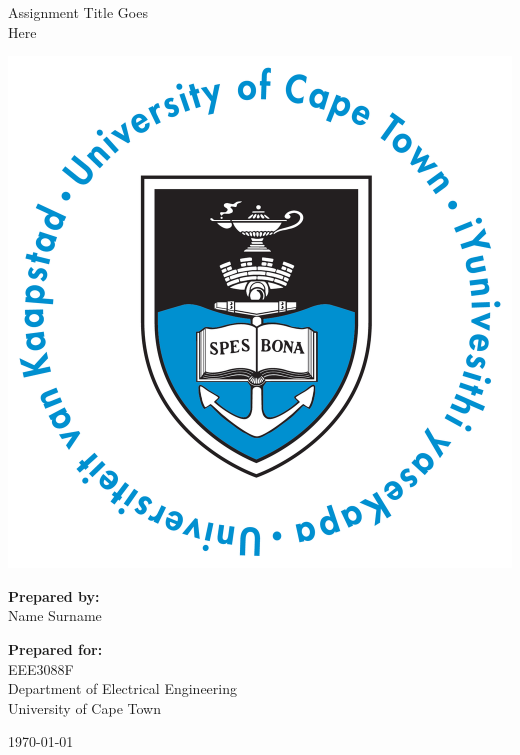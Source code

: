 \thispagestyle{empty}
\begin{center}
    
\Huge

\vspace{5cm}

Assignment Title Goes\\Here

\vspace{2.5cm}

\includegraphics[width=0.6\linewidth]{FrontMatter/UCT_logo.png}

\vfill

\large
\textbf{Prepared by:}\\
Name Surname

\vspace{1cm}

\textbf{Prepared for:}\\
EEE3088F\\
Department of Electrical Engineering\\
University of Cape Town

\vspace{2cm}

\today


\end{center}